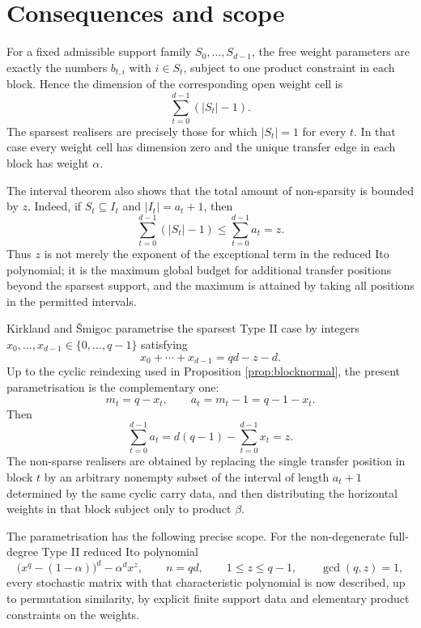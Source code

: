 \documentclass[11pt]{article}
\theoremstyle{definition}
\theoremstyle{remark}
\begin{document}
\section{Consequences and scope}
\label{sec:consequences}

For a fixed admissible support family $S_0,\ldots,S_{d-1}$, the free weight parameters are exactly the numbers $b_{t,i}$ with $i\in S_t$, subject to one product constraint in each block.  Hence the dimension of the corresponding open weight cell is
\begin{equation}
        \sum_{t=0}^{d-1}(|S_t|-1).
        \label{eq:dimension}
\end{equation}
The sparsest realisers are precisely those for which $|S_t|=1$ for every $t$.  In that case every weight cell has dimension zero and the unique transfer edge in each block has weight $\alpha$.

The interval theorem also shows that the total amount of non-sparsity is bounded by $z$.  Indeed, if $S_t\subseteq I_t$ and $|I_t|=a_t+1$, then
\[
        \sum_{t=0}^{d-1}(|S_t|-1)
        \le
        \sum_{t=0}^{d-1}a_t
        =z .
\]
Thus $z$ is not merely the exponent of the exceptional term in the reduced Ito polynomial; it is the maximum global budget for additional transfer positions beyond the sparsest support, and the maximum is attained by taking all positions in the permitted intervals.

Kirkland and \v Smigoc parametrise the sparsest Type II case by integers $x_0,\ldots,x_{d-1}\in\{0,\ldots,q-1\}$ satisfying
\[
        x_0+\cdots+x_{d-1}=qd-z-d .
\]
Up to the cyclic reindexing used in Proposition \ref{prop:blocknormal},
the present parametrisation is the complementary one:
\[
        m_t=q-x_t,
        \qquad
        a_t=m_t-1=q-1-x_t .
\]
Then
\[
        \sum_{t=0}^{d-1}a_t
        =d(q-1)-\sum_{t=0}^{d-1}x_t
        =z .
\]
The non-sparse realisers are obtained by replacing the single transfer position in block $t$ by an arbitrary nonempty subset of the interval of length $a_t+1$ determined by the same cyclic carry data, and then distributing the horizontal weights in that block subject only to product $\beta$.

The parametrisation has the following precise scope. For the non-degenerate full-degree Type II reduced Ito polynomial
\[
        \bigl(x^q-(1-\alpha)\bigr)^d-\alpha^d x^z,
        \qquad n=qd,
        \qquad 1\le z\le q-1,
        \qquad \gcd(q,z)=1,
\]
every stochastic matrix with that characteristic polynomial is now described, up to permutation similarity, by explicit finite support data and elementary product constraints on the weights.
\end{document}
